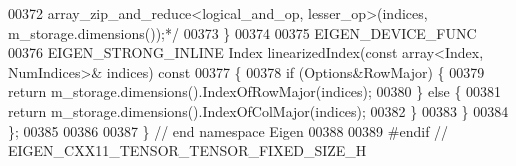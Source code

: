 \begin{DoxyCode}
00372 \textcolor{comment}{        array\_zip\_and\_reduce<logical\_and\_op, lesser\_op>(indices, m\_storage.dimensions());*/}
00373     \}
00374 
00375     EIGEN\_DEVICE\_FUNC
00376     EIGEN\_STRONG\_INLINE Index linearizedIndex(\textcolor{keyword}{const} array<Index, NumIndices>& indices)\textcolor{keyword}{ const}
00377 \textcolor{keyword}{    }\{
00378       \textcolor{keywordflow}{if} (Options&RowMajor) \{
00379         \textcolor{keywordflow}{return} m\_storage.dimensions().IndexOfRowMajor(indices);
00380       \} \textcolor{keywordflow}{else} \{
00381         \textcolor{keywordflow}{return} m\_storage.dimensions().IndexOfColMajor(indices);
00382       \}
00383     \}
00384 \};
00385 
00386 
00387 \} \textcolor{comment}{// end namespace Eigen}
00388 
00389 \textcolor{preprocessor}{#endif // EIGEN\_CXX11\_TENSOR\_TENSOR\_FIXED\_SIZE\_H}
\end{DoxyCode}
